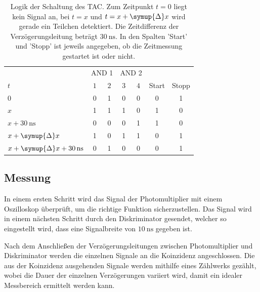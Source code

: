  \begin{table}
    \centering
    \caption{Logik der Schaltung des TAC. Zum Zeitpunkt $t=0$ liegt kein Signal an, bei $t=x$ und $t=x+\symup{\Delta}x$ wird gerade ein Teilchen detektiert. %
    Die Zeitdifferenz der Verzögerungsleitung beträgt $\qty{30}{\nano\second}$. In den Spalten 'Start' und 'Stopp' ist jeweils angegeben, ob die Zeitmessung %
    gestartet ist oder nicht.}
    \label{tab:Logik}
    \begin{tabular}{l | c c | c c | c c}
      \toprule
      {} & \multicolumn{2}{c|}{AND 1} & \multicolumn{2}{c|}{AND 2} & {} & {} \\
      $t$ & $1$ & $2$ & $3$ & $4$ & Start & Stopp \\
      \midrule
      $0$                                               & 0 & 1 & 0 & 0 & 0 & 1 \\
      $x$                                               & 1 & 1 & 1 & 0 & 1 & 0 \\
      {$x + \qty{30}{\nano\second}$}                    & 0 & 0 & 0 & 1 & 1 & 0 \\
      {$x + \symup{\Delta}x$}                           & 1 & 0 & 1 & 1 & 0 & 1 \\
      {$x + \symup{\Delta}x + \qty{30}{\nano\second}$}  & 0 & 1 & 0 & 0 & 0 & 1 \\      
      
      \bottomrule
    \end{tabular}
  \end{table}

  \subsection{Messung}
  \label{subsec:Messung}
  In einem ersten Schritt wird das Signal der Photomultiplier mit einem Oszilloskop überprüft, um die richtige Funktion sicherzustellen. Das Signal wird in einem nächsten Schritt durch den
  Diskriminator gesendet, welcher so eingestellt wird, dass eine Signalbreite von $\qty{10}{\nano\second}$ gegeben ist.

  Nach dem Anschließen der Verzögerungsleitungen zwischen Photomultiplier und Diskriminator werden die einzelnen Signale an die Koinzidenz angeschlossen. Die aus der Koinzidenz ausgehenden
  Signale werden mithilfe eines Zählwerks gezählt, wobei die Dauer der einzelnen Verzögerungen variiert wird, damit ein idealer Messbereich ermittelt werden kann.

